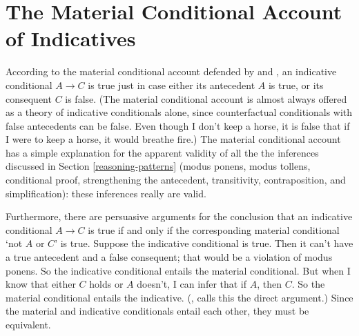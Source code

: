 \section{The Material Conditional Account of Indicatives}
\label{material}

According to the material conditional account defended by \citet{grice-studies} and \citet{jackson}, an indicative conditional $A \rightarrow C$ is true just in case either its antecedent $A$ is true, or its consequent $C$ is false.  (The material conditional account is almost always offered as a theory of indicative conditionals alone, since counterfactual conditionals with false antecedents can be false.  Even though I don't keep a horse, it is false that if I were to keep a horse, it would breathe fire.)  The material conditional account has a simple explanation for the apparent validity of all the the inferences discussed in Section \ref{reasoning-patterns} (modus ponens, modus tollens, conditional proof, strengthening the antecedent, transitivity, contraposition, and simplification): these inferences really are valid.

Furthermore, there are persuasive arguments for the conclusion that an indicative conditional $A \rightarrow C$ is true if and only if the corresponding material conditional `not $A$ or $C$' is true.  Suppose the indicative conditional is true.  Then it can't have a true antecedent and a false consequent; that would be a violation of modus ponens.  So the indicative conditional entails the material conditional.  But when I know that either $C$ holds or $A$ doesn't, I can infer that if $A$, then $C$.  So the material conditional entails the indicative.  (\citealp[136]{stalnaker-indicative}, calls this the direct argument.)  Since the material and indicative conditionals entail each other, they must be equivalent.

